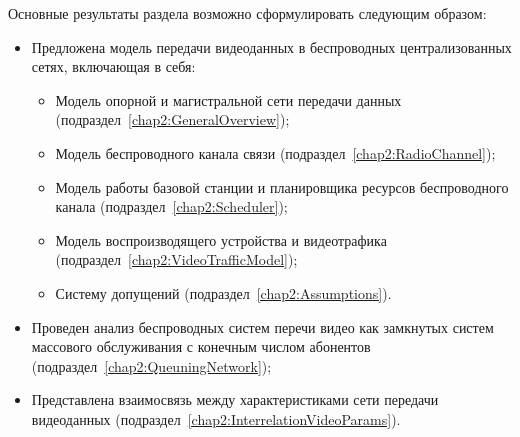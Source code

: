 Основные результаты раздела возможно сформулировать следующим образом:
\begin{itemize}
	\item Предложена модель передачи видеоданных в беспроводных централизованных сетях, включающая в себя:
	\begin{itemize}
		\item Модель опорной и магистральной сети передачи данных (подраздел~\ref{chap2:GeneralOverview});
		\item Модель беспроводного канала связи (подраздел~\ref{chap2:RadioChannel});
		\item Модель работы базовой станции и планировщика ресурсов беспроводного канала (подраздел~\ref{chap2:Scheduler});
		\item Модель воспроизводящего устройства и видеотрафика (подраздел~\ref{chap2:VideoTrafficModel});
		\item Систему допущений (подраздел~\ref{chap2:Assumptions}).
	\end{itemize}
	\item Проведен анализ беспроводных систем перечи видео как замкнутых систем массового обслуживания с конечным числом абонентов (подраздел~\ref{chap2:QueuningNetwork});
	\item Представлена взаимосвязь между характеристиками сети передачи видеоданных (подраздел~\ref{chap2:InterrelationVideoParams}).
\end{itemize}